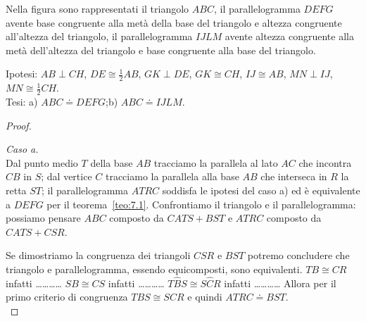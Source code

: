 Nella figura sono rappresentati il triangolo $ABC$, il 
parallelogramma $DEFG$ avente base congruente alla metà della base del 
triangolo e altezza congruente all'altezza del triangolo, il 
parallelogramma $IJLM$ avente altezza congruente alla metà 
dell'altezza del triangolo e base congruente alla base del triangolo.

\noindent Ipotesi: $AB\perp CH$, $DE\cong \frac{1}{2}AB$, $GK\perp 
DE$, $GK\cong CH$, $IJ\cong AB$, $MN\perp IJ$, $MN\cong 
\frac{1}{2}CH$.\\
Tesi: a) $ABC\doteq DEFG$;\quad b) $ABC\doteq IJLM$.

\begin{figure*}[!htb]
  \centering
\end{figure*}

\begin{proof}~\vspace{4pt}\\
\noindent\begin{minipage}{0.65\textwidth}\parindent15pt
\noindent\emph{Caso a.}\\
Dal punto medio $T$ della base $AB$ tracciamo la parallela al lato 
$AC$ che incontra $CB$ in $S$; dal vertice $C$ tracciamo la parallela 
alla base $AB$ che interseca in $R$ la retta $ST$; il parallelogramma 
$ATRC$ soddisfa le ipotesi del caso a) ed è equivalente a $DEFG$ per 
il teorema~\ref{teo:7.1}.
Confrontiamo il triangolo e il parallelogramma: possiamo pensare 
$ABC$ composto da $CATS+BST$ e $ATRC$ composto da $CATS+CSR$.
\end{minipage}\hfil
\begin{minipage}{0.35\textwidth}
  \centering
\end{minipage}\vspace{1pt}
Se dimostriamo la congruenza dei triangoli $CSR$ e $BST$ potremo 
concludere che triangolo e parallelogramma, essendo equicomposti, 
sono equivalenti. 
$TB\cong CR$ infatti \ldots\ldots\ldots\ldots{}
$SB\cong CS$ infatti \ldots\ldots\ldots\ldots{}
$T\widehat{B}S\cong S\widehat{C}R$ infatti \ldots\ldots\ldots\ldots{}
Allora per il primo criterio di congruenza $TBS\cong SCR$ e quindi 
$ATRC\doteq BST$.\\


\end{proof}
